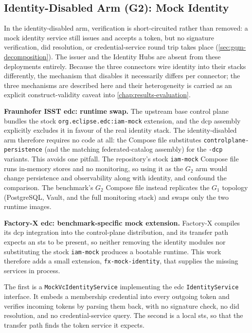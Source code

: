 \subsection{Identity-Disabled Arm (G2): Mock Identity}\label{subsec:mock-arm}

In the identity-disabled arm, verification is short-circuited rather than removed: a mock identity service still issues and accepts a token, but no signature verification, \gls{did} resolution, or credential-service round trip takes place (\cref{sec:gqm-decomposition}). The issuer and the Identity Hubs are absent from these deployments entirely. Because the three connectors wire identity into their stacks differently, the mechanism that disables it necessarily differs per connector; the three mechanisms are described here and their heterogeneity is carried as an explicit construct-validity caveat into \cref{chap:results-evaluation}.

\textbf{Fraunhofer ISST \gls{edc}: runtime swap.} The upstream base control plane bundles the stock \texttt{org.eclipse.edc:iam-mock} extension, and the \gls{dcp} assembly explicitly excludes it in favour of the real identity stack. The identity-disabled arm therefore requires no code at all: the Compose file substitutes \texttt{controlplane-persistence} (and the matching federated-catalog assembly) for the \texttt{-dcp} variants. This avoids one pitfall. The repository's stock \texttt{iam-mock} Compose file runs in-memory stores and no monitoring, so using it as the $G_2$ arm would change persistence and observability along with identity, and confound the comparison. The benchmark's $G_2$ Compose file instead replicates the $G_1$ topology (PostgreSQL, Vault, and the full monitoring stack) and swaps only the two runtime images.

\textbf{Factory-X \gls{edc}: benchmark-specific mock extension.} Factory-X compiles its \gls{dcp} integration into the control-plane distribution, and its transfer path expects an \gls{sts} to be present, so neither removing the identity modules nor substituting the stock \texttt{iam-mock} produces a bootable runtime. This work therefore adds a small extension, \texttt{fx-mock-identity}, that supplies the missing services in process.

The first is a \texttt{MockVcIdentityService} implementing the \gls{edc} \texttt{IdentityService} interface. It embeds a membership credential into every outgoing token and verifies incoming tokens by parsing them back, with no signature check, no \gls{did} resolution, and no credential-service query. The second is a local \gls{sts}, so that the transfer path finds the token service it expects.

